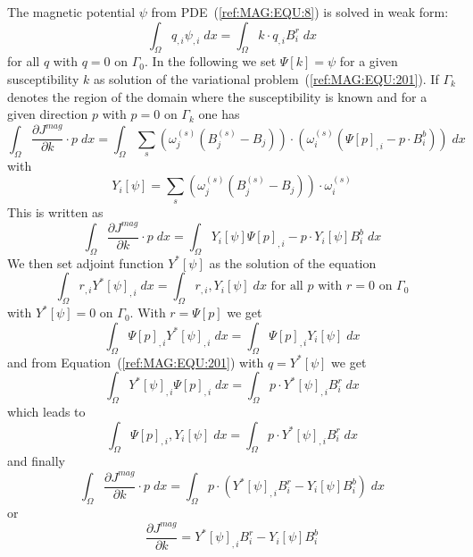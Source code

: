 The magnetic potential $\psi$ from PDE~(\ref{ref:MAG:EQU:8}) is solved in weak form:
\begin{equation}\label{ref:MAG:EQU:201}
\int_{\Omega} q_{,i} \psi_{,i} \; dx  = \int_{\Omega}  k \cdot q_{,i}  B^r_i \; dx 
\end{equation} 
for all $q$ with $q=0$ on $\Gamma_{0}$.
In the following we set $\Psi[k]=\psi$ for a given susceptibility $k$ as
solution of the variational problem~(\ref{ref:MAG:EQU:201}).
If $\Gamma_{k}$ denotes the region of the domain where the susceptibility is
known and for a given direction $p$ with $p=0$ on $\Gamma_{k}$ one has
\begin{equation}\label{ref:MAG:EQU:201aa}
\int_{\Omega}   \frac{\partial J^{mag}}{\partial k} \cdot p \; dx  = \int_{\Omega}  
\sum_{s} (\omega^{(s)}_j 
( B^{(s)}_j-B_{j}))  \cdot ( \omega^{(s)}_i ( \Psi[p]_{,i} - p  \cdot B^b_i  ) ) \; dx  
\end{equation} 
with
\begin{equation}\label{ref:MAG:EQU:202c}
Y_i[\psi]=   \sum_{s} (\omega^{(s)}_j 
(B^{(s)}_j - B_{j}) )  \cdot \omega^{(s)}_i  
\end{equation} 
This is written as 
\begin{equation}\label{ref:MAG:EQU:202cc}
\int_{\Omega}   \frac{\partial J^{mag}}{\partial k} \cdot p \;  dx  = \int_{\Omega}  
Y_i[\psi] \Psi[p]_{,i} - p \cdot Y_i[\psi]B^b_i   \; dx  
\end{equation} 
We then set adjoint function $Y^*[\psi]$ as the solution of the equation 
\begin{equation}\label{ref:MAG:EQU:202d}
\int_{\Omega} r_{,i} Y^*[\psi]_{,i} \; dx  =  \int_{\Omega} r_{,i} ,Y_i[\psi]  \; dx  \mbox{ for all } p \mbox{ with } r=0 \mbox{ on } \Gamma_{0}
\end{equation} 
with $Y^*[\psi]=0$ on $\Gamma_{0}$. With $r=\Psi[p]$ we get
\begin{equation}\label{ref:MAG:EQU:202dd}
\int_{\Omega} \Psi[p]_{,i} Y^*[\psi]_{,i} \; dx  =  \int_{\Omega} \Psi[p]_{,i} Y_i[\psi]  \; dx
\end{equation} 
and from Equation~(\ref{ref:MAG:EQU:201}) with $q=Y^*[\psi]$ we get
\begin{equation}\label{ref:MAG:EQU:20e}
\int_{\Omega} Y^*[\psi]_{,i}  \Psi[p]_{,i} \; dx  = \int_{\Omega}  p \cdot Y^*[\psi]_{,i}  B^r_i \; dx  
\end{equation}
which leads to 
\begin{equation}\label{ref:MAG:EQU:20ee}
\int_{\Omega} \Psi[p]_{,i} ,Y_i[\psi]  \; dx  = \int_{\Omega}  p \cdot Y^*[\psi]_{,i}  B^r_i \; dx  
\end{equation}
and finally
\begin{equation}\label{ref:MAG:EQU:201a}
\int_{\Omega}   \frac{\partial J^{mag}}{\partial k} \cdot p \;  dx  = \int_{\Omega}  
p \cdot (Y^*[\psi]_{,i}  B^r_i - Y_i[\psi] B^b_i) \; dx  
\end{equation} 
or 
\begin{equation}\label{ref:MAG:EQU:201b}
\frac{\partial J^{mag}}{\partial k} = Y^*[\psi]_{,i}  B^r_i - Y_i[\psi] B^b_i
\end{equation}

